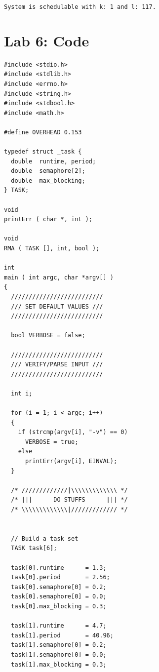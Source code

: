 \documentclass[11pt]{report}
\begin{document}
\begin{spacing}{1.5}
\begin{lstlisting}
System is schedulable with k: 1 and l: 117.
\end{lstlisting}


\section*{Lab 6: Code}
\begin{lstlisting}
#include <stdio.h>
#include <stdlib.h>
#include <errno.h>
#include <string.h>
#include <stdbool.h>
#include <math.h>

#define OVERHEAD 0.153

typedef struct _task {
  double  runtime, period;
  double  semaphore[2];
  double  max_blocking;
} TASK;

void
printErr ( char *, int );

void
RMA ( TASK [], int, bool );

int
main ( int argc, char *argv[] )
{
  //////////////////////////
  /// SET DEFAULT VALUES ///
  //////////////////////////

  bool VERBOSE = false;

  //////////////////////////
  /// VERIFY/PARSE INPUT ///
  //////////////////////////

  int i;

  for (i = 1; i < argc; i++)
  {
    if (strcmp(argv[i], "-v") == 0)
      VERBOSE = true;
    else
      printErr(argv[i], EINVAL);
  }

  /* /////////////|\\\\\\\\\\\\\ */
  /* |||      DO STUFFS      ||| */
  /* \\\\\\\\\\\\\|///////////// */


  // Build a task set
  TASK task[6];

  task[0].runtime      = 1.3;
  task[0].period       = 2.56;
  task[0].semaphore[0] = 0.2;
  task[0].semaphore[0] = 0.0;
  task[0].max_blocking = 0.3;

  task[1].runtime      = 4.7;
  task[1].period       = 40.96;
  task[1].semaphore[0] = 0.2;
  task[1].semaphore[0] = 0.0;
  task[1].max_blocking = 0.3;


\end{lstlisting}
\end{spacing}
\end{document}
